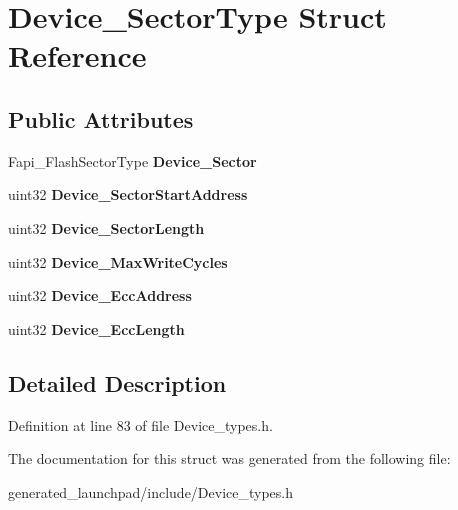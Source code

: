 \hypertarget{structDevice__SectorType}{}\section{Device\+\_\+\+Sector\+Type Struct Reference}
\label{structDevice__SectorType}
\subsection*{Public Attributes}
\begin{DoxyCompactItemize}
\item 
\mbox{\label{structDevice__SectorType_a3348dc841961c6ebce8a4b0f815059fb}} 
Fapi\+\_\+\+Flash\+Sector\+Type {\bfseries Device\+\_\+\+Sector}
\item 
\mbox{\label{structDevice__SectorType_a0565400358dae2701f26b87343ab6397}} 
uint32 {\bfseries Device\+\_\+\+Sector\+Start\+Address}
\item 
\mbox{\label{structDevice__SectorType_aa4ee713709a1cee0f0bbf38574824cc0}} 
uint32 {\bfseries Device\+\_\+\+Sector\+Length}
\item 
\mbox{\label{structDevice__SectorType_a87d965753ffaf9f0e36d8357cdc1ee14}} 
uint32 {\bfseries Device\+\_\+\+Max\+Write\+Cycles}
\item 
\mbox{\label{structDevice__SectorType_ae178d68e175ad3cce3cf7e7172ac55c0}} 
uint32 {\bfseries Device\+\_\+\+Ecc\+Address}
\item 
\mbox{\label{structDevice__SectorType_a5ab9a748c27bc2e88aa3922a0d024beb}} 
uint32 {\bfseries Device\+\_\+\+Ecc\+Length}
\end{DoxyCompactItemize}


\subsection{Detailed Description}


Definition at line 83 of file Device\+\_\+types.\+h.



The documentation for this struct was generated from the following file\+:\begin{DoxyCompactItemize}
\item 
generated\+\_\+launchpad/include/Device\+\_\+types.\+h\end{DoxyCompactItemize}
